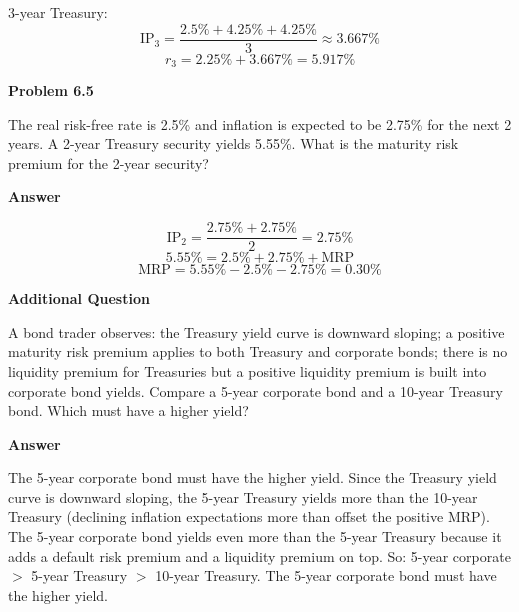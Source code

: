 \documentclass[11pt]{article}
\begin{document}
3-year Treasury:
\[
\text{IP}_3 = \frac{2.5\% + 4.25\% + 4.25\%}{3} \approx 3.667\%
\]
\[
r_3 = 2.25\% + 3.667\% = \boxed{5.917\%}
\]

\bigskip\bigskip

\textbf{Problem 6.5}
\bigskip

The real risk-free rate is 2.5\% and inflation is expected to be 2.75\% for the next 2 years. A 2-year Treasury security yields 5.55\%. What is the maturity risk premium for the 2-year security?

\bigskip
\textbf{Answer}
\bigskip

\[
\text{IP}_2 = \frac{2.75\% + 2.75\%}{2} = 2.75\%
\]
\[
5.55\% = 2.5\% + 2.75\% + \text{MRP}
\]
\[
\text{MRP} = 5.55\% - 2.5\% - 2.75\% = \boxed{0.30\%}
\]

\bigskip\bigskip

\textbf{Additional Question}
\bigskip

A bond trader observes: the Treasury yield curve is downward sloping; a positive maturity risk premium applies to both Treasury and corporate bonds; there is no liquidity premium for Treasuries but a positive liquidity premium is built into corporate bond yields. Compare a 5-year corporate bond and a 10-year Treasury bond. Which must have a higher yield?

\bigskip
\textbf{Answer}
\bigskip

The 5-year corporate bond must have the higher yield. Since the Treasury yield curve is downward sloping, the 5-year Treasury yields more than the 10-year Treasury (declining inflation expectations more than offset the positive MRP). The 5-year corporate bond yields even more than the 5-year Treasury because it adds a default risk premium and a liquidity premium on top. So: 5-year corporate $>$ 5-year Treasury $>$ 10-year Treasury. The 5-year corporate bond must have the higher yield.
\end{document}
